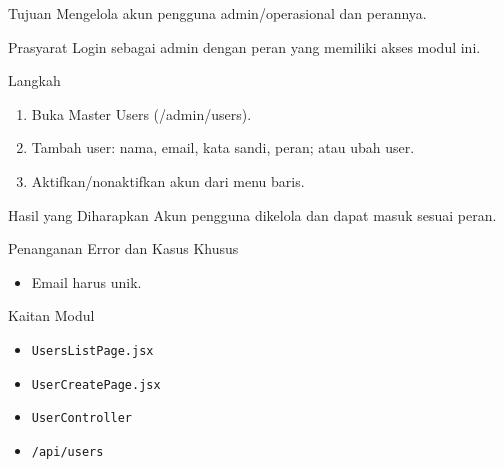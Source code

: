 
\begin{flowsection}{Tujuan}
Mengelola akun pengguna admin/operasional dan perannya.
\end{flowsection}

\begin{flowsection}{Prasyarat}
Login sebagai admin dengan peran yang memiliki akses modul ini.
\end{flowsection}

\begin{flowsection}{Langkah}
\begin{enumerate}
  \item Buka Master Users (/admin/users).
  \item Tambah user: nama, email, kata sandi, peran; atau ubah user.
  \item Aktifkan/nonaktifkan akun dari menu baris.
\end{enumerate}
\end{flowsection}


\begin{flowsection}{Hasil yang Diharapkan}
Akun pengguna dikelola dan dapat masuk sesuai peran.
\end{flowsection}

\begin{flowsection}{Penanganan Error dan Kasus Khusus}
\begin{itemize}
  \item Email harus unik.
\end{itemize}
\end{flowsection}

\begin{flowsection}{Kaitan Modul}
\begin{itemize}
  \item \texttt{UsersListPage.jsx}
  \item \texttt{UserCreatePage.jsx}
  \item \texttt{UserController}
  \item \texttt{/api/users}
\end{itemize}
\end{flowsection}

